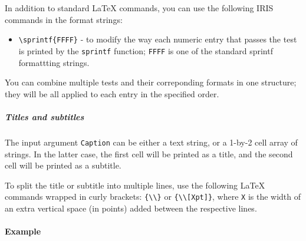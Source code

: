  In addition to standard LaTeX commands, you can use the following IRIS
 commands in the format strings:
 
 \begin{itemize}
 \item
   \texttt{\textbackslash{}sprintf\{FFFF\}} - to modify the way each
   numeric entry that passes the test is printed by the \texttt{sprintf}
   function; \texttt{FFFF} is one of the standard sprintf formattting
   strings.
 \end{itemize}
 
 You can combine multiple tests and their correponding formats in one
 structure; they will be all applied to each entry in the specified
 order.
 
 \subparagraph{Titles and subtitles}
 
 The input argument \texttt{Caption} can be either a text string, or a
 1-by-2 cell array of strings. In the latter case, the first cell will be
 printed as a title, and the second cell will be printed as a subtitle.
 
 To split the title or subtitle into multiple lines, use the following
 LaTeX commands wrapped in curly brackets:
 \texttt{\{\textbackslash{}\textbackslash{}\}} or
 \texttt{\{\textbackslash{}\textbackslash{}{[}Xpt{]}\}}, where \texttt{X}
 is the width of an extra vertical space (in points) added between the
 respective lines.
 
 \paragraph{Example}



